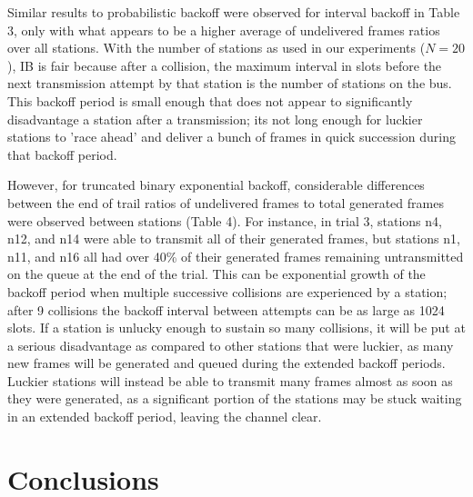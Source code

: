 \documentclass[twocolumn]{article}
\begin{document}
Similar results to probabilistic backoff were observed for interval backoff in Table 3, only 
with what appears to be a higher average of undelivered frames ratios over all stations. With
the number of stations as used in our experiments ($N=20$), IB is fair because
after a collision, the maximum interval in slots before the next transmission
attempt by that station is the number of stations on the bus. This backoff period is 
small enough that does not appear to significantly disadvantage a station after a transmission;
its not long enough for luckier stations to 'race ahead' and deliver a bunch of frames in 
quick succession during that backoff period.

However, for truncated binary exponential backoff, considerable differences
between the end of trail ratios of undelivered frames to total generated frames
were observed between stations (Table 4). For instance, in trial 3, stations n4,
n12, and n14 were able to transmit all of their generated frames, but stations
n1, n11, and n16 all had over 40\% of their generated frames remaining
untransmitted on the queue at the end of the trial. This can be exponential
growth of the backoff period when multiple successive collisions are experienced
by a station; after 9 collisions the backoff interval between attempts can be as
large as 1024 slots. If a station is unlucky enough to sustain so many
collisions, it will be put at a serious disadvantage as compared to other
stations that were luckier, as many new frames will be generated and queued
during the extended backoff periods. Luckier stations will instead be able to transmit many
frames almost as soon as they were generated, as a significant portion of the stations
may be stuck waiting in an extended backoff period, leaving the channel clear.


\section*{Conclusions}
\end{document}
